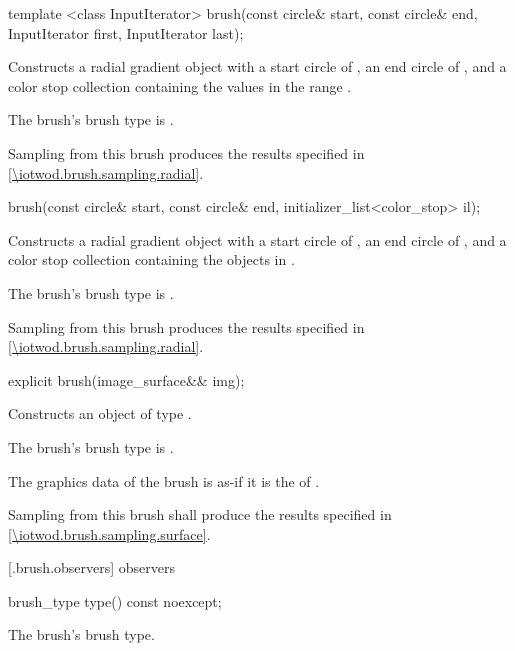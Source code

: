\begin{itemdecl}
template <class InputIterator>
brush(const circle& start, const circle& end,
  InputIterator first, InputIterator last);
\end{itemdecl}
\begin{itemdescr}
\pnum
\effects
Constructs a radial gradient  object with a start circle of , an end circle of , and a color stop collection containing the values in the range .

\pnum
The brush's brush type is .

\pnum
\remarks
Sampling from this brush produces the results specified in \ref{\iotwod.brush.sampling.radial}.
\end{itemdescr}

\begin{itemdecl}
brush(const circle& start, const circle& end,
  initializer_list<color_stop> il);
\end{itemdecl}
\begin{itemdescr}
\pnum
\effects
Constructs a radial gradient  object with a start circle of , an end circle of , and a color stop collection containing the  objects in .

\pnum
The brush's brush type is .

\pnum
\remarks
Sampling from this brush produces the results specified in \ref{\iotwod.brush.sampling.radial}.
\end{itemdescr}

\begin{itemdecl}
explicit brush(image_surface&& img);
\end{itemdecl}
\begin{itemdescr}
\pnum
\pnum
\effects
Constructs an object of type .

\pnum
The brush's brush type is .

\pnum
The graphics data of the brush is as-if it is the \underlyingimagesurface of .

\pnum
\remarks
Sampling from this brush shall produce the results specified in \ref{\iotwod.brush.sampling.surface}.
\end{itemdescr}

 [\iotwod.brush.observers]{ observers}

\begin{itemdecl}
brush_type type() const noexcept;
\end{itemdecl}
\begin{itemdescr}
\pnum
\returns
The brush's brush type.
\end{itemdescr}
